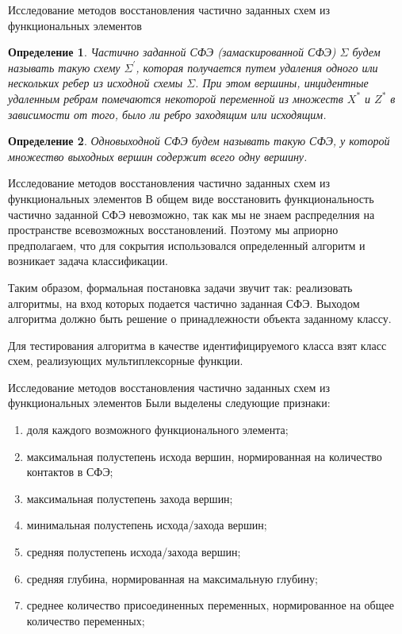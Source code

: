 \documentclass[serif,utf8]{beamer}
\newtheorem{mydef}{Определение}
\begin{document}
\begin{frame}{Исследование методов восстановления частично заданных схем из функциональных элементов}

\begin{mydef}
Частично заданной СФЭ (замаскированной СФЭ) $\Sigma$ будем называть такую схему $\Sigma^{'}$, которая получается путем удаления одного или нескольких ребер из исходной схемы $\Sigma$. При этом вершины, инцидентные удаленным ребрам помечаются некоторой переменной из множеств $X^{\ast}$ и $Z^{\ast}$ в зависимости от того, было ли ребро заходящим или исходящим.
\end{mydef}

\begin{mydef}
Одновыходной СФЭ будем называть такую СФЭ, у которой множество выходных вершин содержит всего одну вершину.
\end{mydef}

\end{frame}

\begin{frame}{Исследование методов восстановления частично заданных схем из функциональных элементов}
В общем виде восстановить функциональность частично заданной СФЭ невозможно, так как мы не знаем распределния на пространстве всевозможных восстановлений. Поэтому мы априорно предполагаем, что для сокрытия использовался определенный алгоритм и возникает задача классификации.\par
Таким образом, формальная постановка задачи звучит так: реализовать алгоритмы, на вход которых подается частично заданная СФЭ. Выходом алгоритма должно быть решение о принадлежности объекта заданному классу.\par
Для тестирования алгоритма в качестве идентифицируемого класса взят класс схем, реализующих мультиплексорные функции.
\end{frame}

\begin{frame}{Исследование методов восстановления частично заданных схем из функциональных элементов}
Были выделены следующие признаки:
\begin{enumerate}
\item доля каждого возможного функционального элемента;
\item максимальная полустепень исхода вершин, нормированная на количество контактов в СФЭ;
\item максимальная полустепень захода вершин;
\item минимальная полустепень исхода/захода вершин;
\item средняя полустепень исхода/захода вершин;
\item средняя глубина, нормированная на максимальную глубину;
\item среднее количество присоединенных переменных, нормированное на общее количество переменных;
\end{enumerate}
\end{frame}
\end{document}
